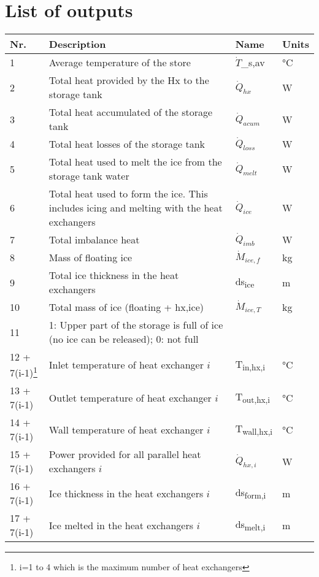 \documentclass[english]{SPFReport}
\begin{document}
\section{List of outputs}

\begin{longtable}{| l |  m{8cm} | l | l |}
\hline
\textbf{Nr.} & \textbf{Description}  & \textbf{Name}& \textbf{Units} \\
\hline
1  & Average temperature of the store & \si{$\dot T$_{s,av}} &\si{\degreeCelsius}   \\
2  & Total heat provided by the Hx to the storage tank & \si{$\dot Q_{hx}$}& W \\
3  & Total heat accumulated  of the storage tank& \si{$\dot Q_{acum}$} & W \\
4 & Total heat losses of the storage tank& \si{$\dot Q_{loss}$} & W \\
5 & Total heat used to melt the ice from the storage tank water& \si{$\dot Q_{melt}$} & W \\
6 & Total heat used to form the ice. This includes icing and melting with the heat exchangers & \si{$\dot Q_{ice}$} & W \\
7 & Total imbalance heat & \si{$\dot Q_{imb}$} & W \\
8 & Mass of floating ice & \si{$\dot M_{ice,f}$} & kg \\
9 & Total ice thickness in the heat exchangers & \si{ds_{ice}} & m \\
10 & Total mass of ice (floating + hx,ice) & \si{$\dot M_{ice,T}$} & kg \\
11 & 1: Upper part of the storage is full of ice (no ice can be released); 0: not full &  &\\
\small{12 + 7(i-1)\footnote{i=1 to 4 which is the maximum number of heat exchangers}} & Inlet temperature of heat exchanger $i$ & \si{T_{in,hx,i}} &\si{\degreeCelsius} \\
\small{13 + 7(i-1)} & Outlet temperature of heat exchanger $i$ & \si{T_{out,hx,i}} &\si{\degreeCelsius} \\
\small{14 + 7(i-1) }& Wall temperature of heat exchanger $i$ & \si{T_{wall,hx,i}} &\si{\degreeCelsius}\\
\small{15 + 7(i-1)} & Power provided for all parallel heat exchangers $i$ & \si{$\dot Q_{hx,i}$} & W \\
\small{16 + 7(i-1)} &  Ice thickness in the heat exchangers $i$ & \si{ds_{form,i}} & m \\
\small{17 + 7(i-1)} &  Ice melted in the heat exchangers $i$ & \si{ds_{melt,i}} & m \\

\end{longtable}
\end{document}
